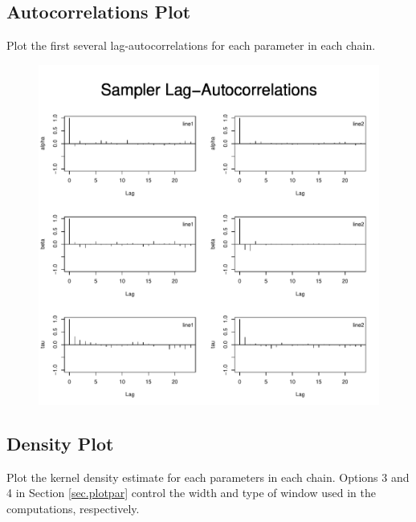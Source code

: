 \documentclass[12pt,letterpaper]{report}
\begin{document}
\pagebreak

\subsection{Autocorrelations Plot}
\noindent
Plot the first several lag-autocorrelations for each parameter in each chain.

\begin{figure}[h]
\centering
\includegraphics[keepaspectratio,width=5in]{autocorr.pdf}
\end{figure}

\pagebreak

\subsection{Density Plot}
\noindent
Plot the kernel density estimate for each parameters in each
chain. Options 3 and 4 in Section \ref{sec.plotpar} control the width and
type of window used in the computations, respectively.
\end{document}
